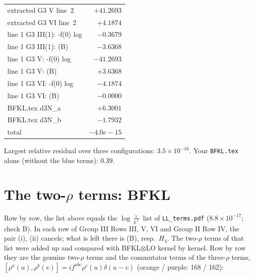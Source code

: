 \documentclass[10pt]{article}
\numberwithin{equation}{section}
\begin{document}
\begin{longtable}{@{}lr@{}}
extracted G3 V line~2 & $+41.2693$\\
extracted G3 VI line~2 & $+4.1874$\\
line 1 G3 III(1): -f(0) log & $-0.3679$\\
line 1 G3 III(1): (B) & $-3.6368$\\
line 1 G3 V: -f(0) log & $-41.2693$\\
line 1 G3 V: (B) & $+3.6368$\\
line 1 G3 VI: -f(0) log & $-4.1874$\\
line 1 G3 VI: (B) & $-0.0000$\\
BFKL.tex d3N\_a & $+6.3001$\\
BFKL.tex d3N\_b & $-1.7932$\\
\midrule
total & $-4.0e-15$\\\bottomrule
\end{longtable}
\noindent Largest relative residual over three configurations: $3.5\times10^{-16}$. Your \texttt{BFKL.tex} alone (without the blue terms): $0.39$.

\section{The two-\texorpdfstring{$\rho$}{rho} terms: BFKL}\label{sec:two}
Row by row, the list above equals the $\log\frac{\vee}{k^+}$ list of \texttt{LL\_terms.pdf} ($8.8\times10^{-17}$; check B). In each row of Group III Rows III, V, VI and Group II Row IV, the pair (i), (ii) cancels; what is left there is (B), resp.\ $H_4$. The two-$\rho$ terms of that list were added up and compared with BFKL$\otimes$LO kernel by kernel. Row by row they are the genuine two-$\rho$ terms and the commutator terms of the three-$\rho$ terms, $[\rho^a(u),\rho^b(v)]=if^{abc}\rho^c(u)\delta(u-v)$ (orange / purple: 168 / 162):
\end{document}

